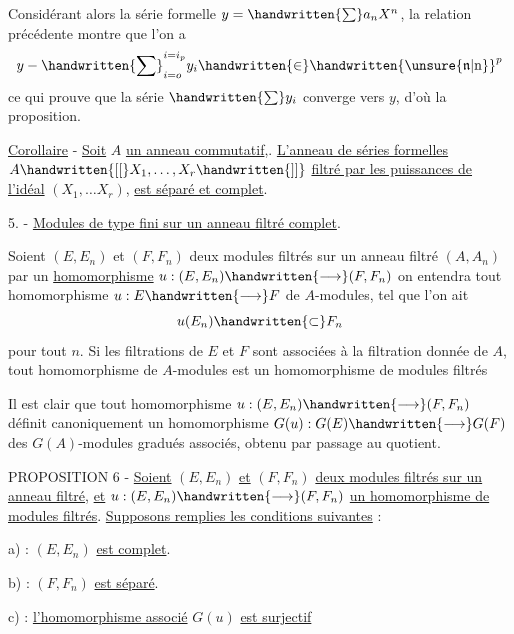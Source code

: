 Considérant alors la série formelle $y=\handwritten{\sum} a_n X^n$, la relation précédente montre que l'on a
\[
y-\handwritten{\sum}_{i=o}^{i=i_p}y_i\handwritten{\in}\handwritten{\unsure{\mathfrak{n}|\mathrm{n}}}^p
\]
ce qui prouve que la série $\handwritten{\sum} y_i$ converge vers $y$, d'où la proposition.

\uline{Corollaire} - \uline{Soit} $A$ \uline{un anneau commutatif},. \uline{L'anneau de séries formelles} $A\handwritten{[[}X_1,\ldots,X_r\handwritten{]]}$ \uline{filtré par les puissances de l'idéal} $(X_1,\ldots X_r)$, \uline{est séparé et complet}.

5. - \uline{Modules de type fini sur un anneau filtré complet}.

Soient $(E,E_n)$ et $(F,F_n)$ deux modules filtrés sur un anneau filtré $(A,A_n)$ par un \uline{homomorphisme} $u:(E,E_n)\handwritten{\longrightarrow}(F,F_n)$ on entendra tout homomorphisme $u:E\handwritten{\longrightarrow} F$ de $A$-modules, tel que l'on ait
\[
u(E_n)\handwritten{\subset} F_n
\]
pour tout $n$. Si les filtrations de $E$ et $F$ sont associées à la filtration donnée de $A$, tout homomorphisme de $A$-modules est un homomorphisme de modules filtrés

Il est clair que tout homomorphisme $u:(E,E_n)\handwritten{\longrightarrow}(F,F_n)$ définit canoniquement un homomorphisme $G(u):G(E)\handwritten{\longrightarrow} G(F)$ des $G(A)$-modules gradués associés, obtenu par passage au quotient.

PROPOSITION 6 - \uline{Soient} $(E,E_n)$ \uline{et} $(F,F_n)$ \uline{deux modules filtrés sur un anneau filtré}, \uline{et} $u:(E,E_n)\handwritten{\longrightarrow}(F,F_n)$ \uline{un homomorphisme de modules filtrés}. \uline{Supposons remplies les conditions suivantes} :

a) : $(E,E_n)$ \uline{est complet}.

b) : $(F,F_n)$ \uline{est séparé}.

c) : \uline{l'homomorphisme associé} $G(u)$ \uline{est surjectif}


